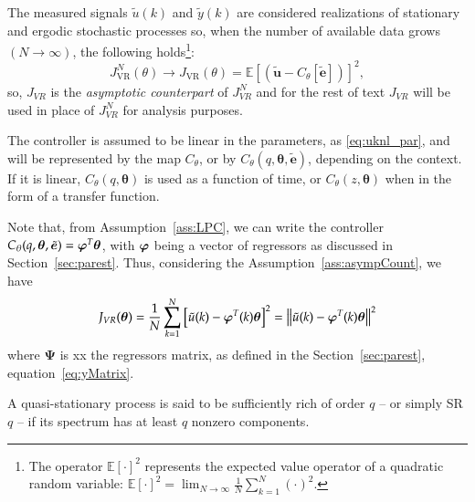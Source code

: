 \begin{assum} \label{ass:asympCount}
   The measured signals $\tilde{u}(k)$ and $\tilde{y}(k)$ are considered realizations of stationary and ergodic stochastic processes so, when the number of available data grows $(N \to \infty)$, the following holds\footnote{The operator $\mathbb{E}[\cdot]^{2}$ represents the expected value operator of a quadratic random variable: $\mathbb{E}[\cdot]^{2} = \lim_{N\to \infty} \frac{1}{N}\sum_{k=1}^{N} \left( \cdot \right)^{2}$.}:
   $$ J_{\mathrm{VR}}^{N}(\theta) \rightarrow J_{\mathrm{VR}}(\theta)=\mathbb{E}\left[ \left(\tilde{\bm{u}}-C_\theta[\tilde{\bm{e}} ]\right)\right]^{2}, $$
   so,  $J_{VR}$ is the \textit{asymptotic counterpart} of $J_{VR}^N$ and for the rest of text $J_{VR}$ will be used in place of $J_{VR}^N$ for analysis purposes.
\end{assum}

\begin{assum} \label{ass:LPC}
   The controller is assumed to be linear in the parameters, as \eqref{eq:uknl_par}, and will be represented by the map $C_{\theta}$, or by $C_\theta(q, \bm{\theta}, \tilde{\bm{e}} )$, depending on the context. If it is linear, $C_\theta(q,\bm{\theta})$ is used as a function of time, or $C_\theta(z,\bm{\theta})$ when in the form of a transfer function.
\end{assum}

Note that, from Assumption~\ref{ass:LPC}, we can write the controller $C_\theta(q,\bm{\theta},\tilde{\bm{e}}) = \bm{\bm{\varphi}}^{T}\bm{\theta}$, with $\bm{\bm{\varphi}}$ being a vector of regressors as discussed in Section~\ref{sec:parest}. Thus, considering the Assumption~\ref{ass:asympCount}, we have
\begin{equation}
   J_{VR}(\bm{\theta}) = \frac{1}{N}\sum_{k=1}^{N} \left[ \tilde{u}(k) - \bm{\varphi}^{T}(k)\bm{\theta} \right]^{2} = \left\lVert\tilde{u}(k)-\bm{\varphi}^T(k)\bm{\theta}\right\rVert^{2}
\label{eq:JVR_reg}
\end{equation}
where $\bm{\Psi}$ is xx the regressors matrix, as defined in the Section~\ref{sec:parest}, equation~\ref{eq:yMatrix}.

\begin{defn} \label{def:SRq}
   A quasi-stationary process is said to be sufficiently rich of order $q$ -- or simply SR$q$ -- if its spectrum has at least $q$ nonzero components.
\end{defn}

